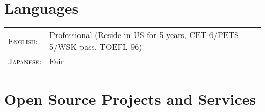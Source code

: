 \documentclass[paper=a4,fontsize=11pt]{scrartcl}
\begin{document}






\section*{Languages}

\begin{tabular}{ll}
	
	\textsc{English:} & Professional (Reside in US for 5 years, CET-6/PETS-5/WSK pass, TOEFL 96) \\
	
	\textsc{Japanese:} & Fair\\
\end{tabular}



\section*{Open Source Projects and Services}
\end{document}
